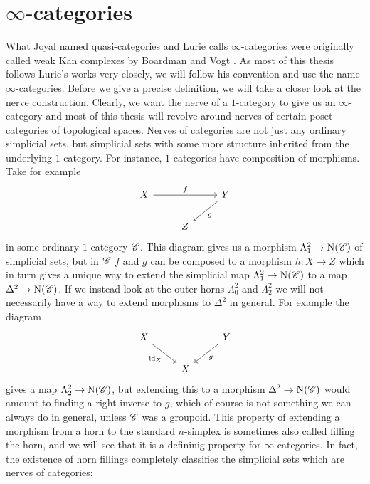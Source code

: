 \documentclass[../thesis.tex]{subfiles}
\begin{document}
\section{$\infty$-categories}
What Joyal \cite{Joyal} named quasi-categories and Lurie \cite{HTT} calls $\infty$-categories were originally called weak Kan complexes by Boardman and Vogt \cite{BoardmanVogt}.
As most of this thesis follows Lurie's works very closely, we will follow his convention and use the name $\infty$-categories.
Before we give a precise definition, we will take a closer look at the nerve construction.
Clearly, we want the nerve of a $1$-category to give us an $\infty$-category and most of this thesis will revolve around nerves of certain poset-categories of topological spaces.
Nerves of categories are not just any ordinary simplicial sets, but simplicial sets with some more structure inherited from the underlying $1$-category.
For instance, $1$-categories have composition of morphisms.
Take for example
\[\begin{tikzcd}
        X && Y \\
        & Z
        \arrow["f", from=1-1, to=1-3]
        \arrow["g", from=1-3, to=2-2]
    \end{tikzcd}\]
in some ordinary $1$-category $\mathscr{C}$.
This diagram gives us a morphism $\Lambda_1^2\to \mathrm{N}(\mathscr{C})$ of simplicial sets, but in $\mathscr{C}$ $f$ and $g$ can be composed to a morphism $h: X \to Z$ which in turn gives a unique way to extend the simplicial map $\Lambda_1^2\to \mathrm{N}(\mathscr{C})$ to a map $\Delta^2 \to \mathrm{N}(\mathscr{C})$.
If we instead look at the outer horns $\Lambda_0^2$ and $\Lambda_2^2$ we will not necessarily have a way to extend morphisms to $\Delta^2$ in general.
For example the diagram
\[\begin{tikzcd}
        X && Y \\
        & X
        \arrow["g", from=1-3, to=2-2]
        \arrow["\id_X"', from=1-1, to=2-2]
    \end{tikzcd}\]
gives a map $\Lambda_2^2\to \mathrm{N}(\mathscr{C})$, but extending this to a morphism $\Delta^2 \to \mathrm{N}(\mathscr{C})$ would amount to finding a right-inverse to $g$, which of course is not something we can always do in general, unless $\mathscr{C}$ was a groupoid.
This property of extending a morphism from a horn to the standard $n$-simplex is sometimes also called filling the horn, and we will see that it is a defininig property for $\infty$-categories.
In fact, the existence of horn fillings completely classifies the simplicial sets which are nerves of categories:
\end{document}
